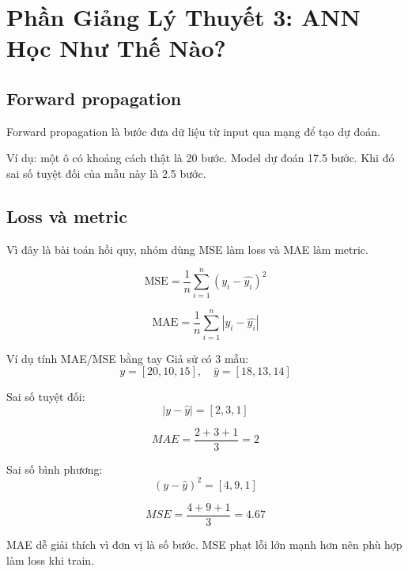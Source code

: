\documentclass[12pt,a4paper]{article}
\begin{document}
\section{Phần Giảng Lý Thuyết 3: ANN Học Như Thế Nào?}

\subsection{Forward propagation}

Forward propagation là bước đưa dữ liệu từ input qua mạng để tạo dự đoán.

\begin{center}
\end{center}

Ví dụ: một ô có khoảng cách thật là 20 bước. Model dự đoán 17.5 bước. Khi đó sai số tuyệt đối của mẫu này là 2.5 bước.

\subsection{Loss và metric}

Vì đây là bài toán hồi quy, nhóm dùng MSE làm loss và MAE làm metric.

\[
    \text{MSE}=\frac{1}{n}\sum_{i=1}^{n}(y_i-\hat{y_i})^2
\]

\[
    \text{MAE}=\frac{1}{n}\sum_{i=1}^{n}|y_i-\hat{y_i}|
\]

\begin{teachbox}{Ví dụ tính MAE/MSE bằng tay}
Giả sử có 3 mẫu:
\[
    y=[20,10,15],\quad \hat{y}=[18,13,14]
\]

Sai số tuyệt đối:
\[
    |y-\hat{y}|=[2,3,1]
\]

\[
    MAE=\frac{2+3+1}{3}=2
\]

Sai số bình phương:
\[
    (y-\hat{y})^2=[4,9,1]
\]

\[
    MSE=\frac{4+9+1}{3}=4.67
\]

MAE dễ giải thích vì đơn vị là số bước. MSE phạt lỗi lớn mạnh hơn nên phù hợp làm loss khi train.
\end{teachbox}
\end{document}
